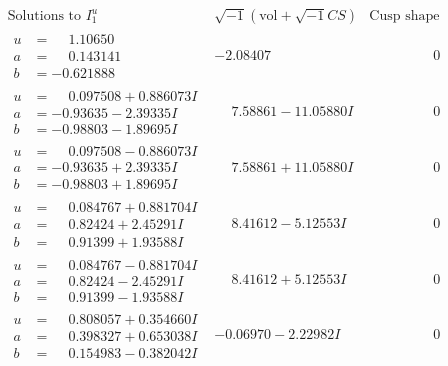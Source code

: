 \documentclass[1p]{elsarticle_modified}
\theoremstyle{definition}
\newcommand{\I}{\sqrt{-1}}
\begin{document}
$$\begin{array}{c|c|c}  
\text{Solutions to }I^u_{1}& \I (\text{vol} + \sqrt{-1}CS) & \text{Cusp shape}\\
 \hline 
\begin{aligned}
u &= \phantom{-}1.10650\phantom{ +0.000000I} \\
a &= \phantom{-}0.143141\phantom{ +0.000000I} \\
b &= -0.621888\phantom{ +0.000000I}\end{aligned}
 & -2.08407\phantom{ +0.000000I} & \phantom{-0.000000 } 0 \\ \hline\begin{aligned}
u &= \phantom{-}0.097508 + 0.886073 I \\
a &= -0.93635 - 2.39335 I \\
b &= -0.98803 - 1.89695 I\end{aligned}
 & \phantom{-}7.58861 - 11.05880 I & \phantom{-0.000000 } 0 \\ \hline\begin{aligned}
u &= \phantom{-}0.097508 - 0.886073 I \\
a &= -0.93635 + 2.39335 I \\
b &= -0.98803 + 1.89695 I\end{aligned}
 & \phantom{-}7.58861 + 11.05880 I & \phantom{-0.000000 } 0 \\ \hline\begin{aligned}
u &= \phantom{-}0.084767 + 0.881704 I \\
a &= \phantom{-}0.82424 + 2.45291 I \\
b &= \phantom{-}0.91399 + 1.93588 I\end{aligned}
 & \phantom{-}8.41612 - 5.12553 I & \phantom{-0.000000 } 0 \\ \hline\begin{aligned}
u &= \phantom{-}0.084767 - 0.881704 I \\
a &= \phantom{-}0.82424 - 2.45291 I \\
b &= \phantom{-}0.91399 - 1.93588 I\end{aligned}
 & \phantom{-}8.41612 + 5.12553 I & \phantom{-0.000000 } 0 \\ \hline\begin{aligned}
u &= \phantom{-}0.808057 + 0.354660 I \\
a &= \phantom{-}0.398327 + 0.653038 I \\
b &= \phantom{-}0.154983 - 0.382042 I\end{aligned}
 & -0.06970 - 2.22982 I & \phantom{-0.000000 } 0 \\ \hline\begin{aligned}

\end{aligned}
\end{array}$$
\end{document}
